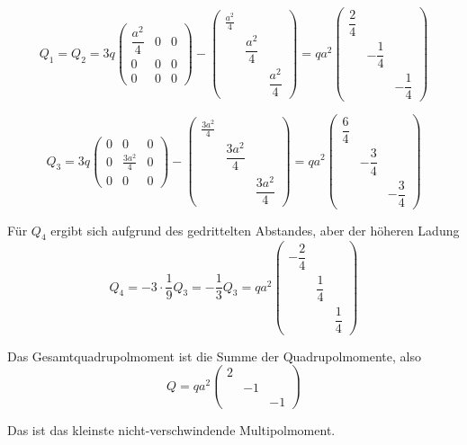 \documentclass[a4paper,german,12pt,smallheadings]{scrartcl}
\begin{document}
\begin{equation}
  Q_1 = Q_2 = 3q\begin{pmatrix}
    \dfrac{a^2}{4} & 0 & 0 \\
    0 & 0 & 0 \\
    0 & 0 & 0
  \end{pmatrix} - \begin{pmatrix}
   \frac{a^2}{4} &       &       \\
                 & \dfrac{a^2}{4} &       \\
                 &       & \dfrac{a^2}{4}
  \end{pmatrix}
  =
  qa^2\begin{pmatrix}
   \dfrac{2}{4} &       &       \\
                 & -\dfrac{1}{4} &       \\
                 &       & -\dfrac{1}{4}
  \end{pmatrix}
\end{equation}

\begin{equation}
  Q_3 = 3q\begin{pmatrix}
    0 & 0 & 0 \\
    0 & \frac{3a^2}{4} & 0 \\
    0 & 0 & 0
  \end{pmatrix} - \begin{pmatrix}
   \frac{3a^2}{4} &       &       \\
                 & \dfrac{3a^2}{4} &       \\
                 &       & \dfrac{3a^2}{4}
  \end{pmatrix}
  =
  qa^2\begin{pmatrix}
   \dfrac{6}{4} &       &       \\
                 & -\dfrac{3}{4} &       \\
                 &       & -\dfrac{3}{4}
  \end{pmatrix}
\end{equation}

Für $Q_4$ ergibt sich aufgrund des gedrittelten Abstandes, aber der höheren Ladung
\begin{equation}
  Q_4 = -3 \cdot \frac{1}{9} Q_3 = -\frac{1}{3} Q_3 = 
    qa^2\begin{pmatrix}
    -\dfrac{2}{4} &       &       \\
                    & \dfrac{1}{4} &       \\
                    &       & \dfrac{1}{4}
    \end{pmatrix}
\end{equation}

Das Gesamtquadrupolmoment ist die Summe der Quadrupolmomente, also
\begin{equation}
  Q = qa^2 \begin{pmatrix}
    2 & & \\
      & -1 & \\
      &    & -1
  \end{pmatrix}
\end{equation}

Das ist das kleinste nicht-verschwindende Multipolmoment.
\end{document}
